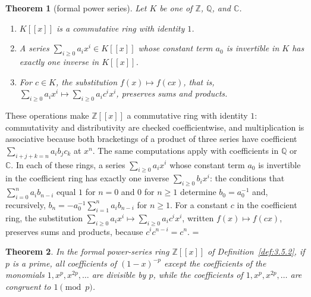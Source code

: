 \documentclass[11pt]{article}
\makeatletter
\let\nt@closedisplay\]
\def\nt@guardedclose{\@ifnextchar\par{\nt@closeafterpar}{\@ifnextchar\end{\postdisplaypenalty\@M\nt@closedisplay}{\nt@closedisplay}}}
\def\nt@closeafterpar\par{\@ifnextchar\par{\nt@closeafterpar}{\@ifnextchar\end{\postdisplaypenalty\@M\nt@closedisplay\par}{\nt@closedisplay\par}}}
\renewenvironment{proof}[1][\proofname]{\par
  \pushQED{\qed}\normalfont\topsep\medskipamount\edef\nt@afterproof{\@endparpenalty=\the\@endparpenalty\relax}\@beginparpenalty\@M\@endparpenalty\@M\let\]\nt@guardedclose\trivlist\item[]\textit{#1\@addpunct{.}} \ignorespaces}{\ifvmode\addpenalty\@M\fi\popQED\nt@afterproof\endtrivlist\@endpefalse}
\theoremstyle{ntstyle}
\newtheorem{theorem}{Theorem}[subsection]
\makeatother
\begin{document}
\begin{theorem}[formal power series]\label{thm:3.5.10}\label{thm:formal-power-series}
  Let $K$ be one of $\mathbb{Z}$, $\mathbb{Q}$, and $\mathbb{C}$.

  \begin{enumerate}[label={\alph*)}]
    \item $K[[x]]$ is a commutative ring with identity $1$.
    \item A series $\sum_{i\ge0}a_ix^i\in K[[x]]$ whose constant term $a_0$ is
          invertible in $K$ has exactly one inverse in $K[[x]]$.
    \item For $c\in K$, the substitution $f(x)\mapsto f(cx)$, that is,
          $\sum_{i\ge0}a_ix^i\mapsto\sum_{i\ge0}a_ic^ix^i$, preserves sums and products.
  \end{enumerate}

\end{theorem}

\begin{proof} These operations make $\mathbb{Z}[[x]]$ a commutative ring with identity
  $1$: commutativity and distributivity are checked coefficientwise, and
  multiplication is associative because both bracketings of a product of
  three series have coefficient $\sum_{i+j+k=n}a_ib_jc_k$ at $x^n$.
  The same computations apply with coefficients in $\mathbb{Q}$ or $\mathbb{C}$.
  In each of these rings, a series
  $\sum_{i\ge0}a_ix^i$ whose constant term $a_0$ is invertible in the
  coefficient ring has exactly one inverse $\sum_{i\ge0}b_ix^i$: the
  conditions that $\sum_{i=0}^{n}a_ib_{n-i}$ equal $1$ for $n=0$ and $0$ for
  $n\ge1$ determine $b_0=a_0^{-1}$ and, recursively,
  $b_n=-a_0^{-1}\sum_{i=1}^{n}a_ib_{n-i}$ for $n\ge1$. For a constant $c$ in the
  coefficient ring, the substitution $\sum_{i\ge0}a_ix^i\mapsto\sum_{i\ge0}a_ic^ix^i$,
  written $f(x)\mapsto f(cx)$, preserves sums and products, because
  $c^ic^{n-i}=c^n$.
\end{proof}

\begin{theorem}\label{thm:3.5.11}\label{thm:frobenius-power-series} In the formal power-series ring
  $\mathbb{Z}[[x]]$ of Definition~\ref{def:3.5.2}, if $p$ is a prime, all coefficients of $(1-x)^{-p}$ except the
  coefficients of the monomials $1, x^{p}, x^{2p}, \ldots$ are divisible by $p$, while the coefficients of
  $1, x^{p}, x^{2p}, \ldots$ are congruent to $1 \pmod{p}$.

\end{theorem}
\end{document}
